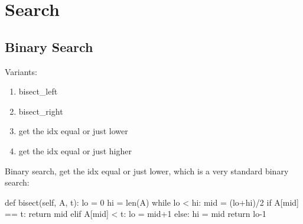 \chapter{Search}

\section{Binary Search}
Variants:
\begin{enumerate}
\item bisect\_left
\item bisect\_right
\item get the idx equal or just lower 
\item get the idx equal or just higher 
\end{enumerate}
Binary search, get the idx equal or just lower, which is a very standard binary search:
\begin{python}
def bisect(self, A, t):
    lo = 0
    hi = len(A)
    while lo < hi:
        mid = (lo+hi)/2
        if A[mid] == t:
            return mid
        elif A[mid] < t:
            lo = mid+1
        else:
            hi = mid
    return lo-1
\end{python}
